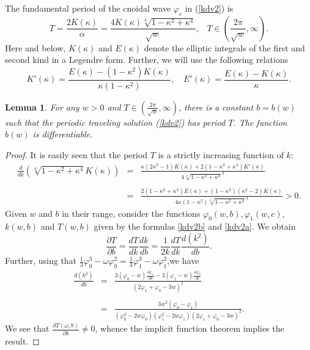 \documentclass[final,11pt,leqno]{amsart}
\newtheorem{lemma}{Lemma}
\begin{document}
The fundamental period of the cnoidal wave $\varphi_c$ in
(\ref{kdv2}) is
 \begin{equation}\label{kdv2b}
   T={\frac{2K(\kappa)}{\alpha}}={\frac{4K(\kappa)\sqrt[4]{1-\kappa^2+\kappa^4}}{\sqrt{w}}}, \; \; \; T\in \left(
   {\frac{2\pi}{\sqrt{w}}}, \infty \right).
 \end{equation}
 Here and below, $K(\kappa)$ and $E(\kappa)$ denote the elliptic
 integrals of the first and second kind in a Legendre form.
 Further, we will use the following relations
   $$
   K'(\kappa)={\frac{E(\kappa)-(1-\kappa^2)K(\kappa)}{\kappa
   (1-\kappa^2)}}, \quad
   E'(\kappa)={\frac{E(\kappa)-K(\kappa)}{\kappa}}.
   $$

\begin{lemma}\label{lkdv1}
For any $w>0$ and $T\in ({\frac{{2\pi}}{{\sqrt{w}}}},\infty)$, there is a constant $b=b(w)$ such that
the periodic traveling solution (\ref{kdv2}) has period $T$. The
function $b(w)$ is differentiable.
\end{lemma}
\begin{proof}
It is easily seen that the period $T$ is a strictly
increasing function of $k$:
\begin{eqnarray*}
\frac{d}{dk}(\sqrt[4]{1-\kappa^2+\kappa^4}K(\kappa))&=& \frac{\kappa(2\kappa^2-1)K(\kappa)+2(1-\kappa^2+\kappa^4)K'(\kappa)}{4\sqrt[4]{1-\kappa^2+\kappa^4}^3}\\
\\
&=& \frac{2(1-\kappa^2+\kappa^4)E(\kappa)+(1-\kappa^2)(\kappa^2-2)K(\kappa)}{4\kappa
(1-\kappa^2)\sqrt[4]{1-\kappa^2+\kappa^4}^3}>0.
\end{eqnarray*}
Given $w$ and $b$ in their range, consider the functions
$\varphi_0(w,b), \varphi_1(w,c)$, $k(w,b)$ and $T(w,b)$ given by
the formulas \eqref{kdv2b} and \eqref{kdv2a}.  We obtain
$$\frac{\partial T}{\partial b}=\frac{dT}{dk} \frac{dk}{db}=
\frac{1}{2k}\frac{dT}{dk}\frac{d(k^2)}{db}.$$
Further, using that
${\frac{1}{3}}\varphi_0^3-\omega
\varphi_0^2={\frac{1}{3}}\varphi_1^3-\omega \varphi_1^2$,we have
\begin{eqnarray*}
\frac{d(k^2)}{db}&=& {\frac{3(\varphi_0-w){\frac{\partial \varphi_1}{\partial b}}-3(\varphi_1-w){\frac{\partial \varphi_0}{\partial c}}}{(2\varphi_1+\varphi_0-3w)^2}}\\
\\
&=&{\frac{3w^2(\varphi_0-\varphi_1)}{(\varphi_0^2-2w
\varphi_0)(\varphi_1^2-2w \varphi_1)(2\varphi_1+\varphi_0-3w)^2}}.
\end{eqnarray*}
We see that ${\frac{{\partial T(\omega,b)}}{{\partial b}}}\neq 0$,  whence the
implicit function theorem implies the result.
\end{proof}
\end{document}
